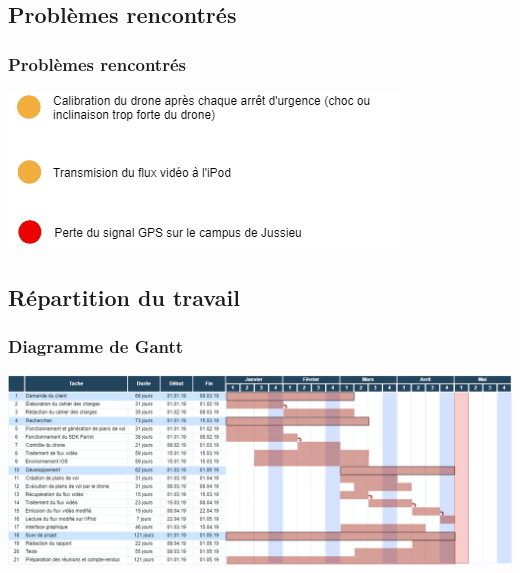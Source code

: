 \documentclass{beamer}
\begin{document}

	
	\begin{frame}
	\section{Problèmes rencontrés}
		\begin{center}
		\frametitle{Problèmes rencontrés}
        \includegraphics[scale=0.75]{problemes.png}
		\end{center}
	\end{frame}

	
	\begin{frame}
		\section{Répartition du travail}
		\begin{center}
		\frametitle{Diagramme de Gantt}
        \includegraphics[scale=0.28]{gantt.png}
		\end{center}
	\end{frame}

	
\end{document}
